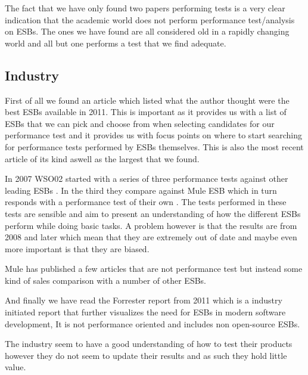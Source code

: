 \documentclass{llncs}
\begin{document}

The fact that we have only found two papers performing tests is a very clear indication that the academic world does not perform performance test/analysis on ESBs. The ones we have found are all considered old in a rapidly changing world and all but one performs a test that we find adequate.


\subsection{Industry}

First of all we found an article\cite{metha11} which listed what the author thought were the best ESBs available in 2011. This is important as it provides us with a list of ESBs that we can pick and choose from when selecting candidates for our performance test and it provides us with focus points on where to start searching for performance tests performed by ESBs themselves. This is also the most recent article of its kind aswell as the largest that we found.

In 2007 WSO02 started with a series of three performance tests against other leading ESBs \cite{Perera07,Perera07R2,Perera07R3}. In the third they compare against Mule ESB which in turn responds with a performance test of their own \cite{mulesoft08}. The tests performed in these tests are sensible and aim to present an understanding of how the different ESBs perform while doing basic tasks. A problem however is that the results are from 2008 and later which mean that they are extremely out of date and maybe even more important is that they are biased.


Mule has published a few articles that are not performance test but instead some kind of sales comparison with a number of other ESBs\cite{mulevsjboss,mulevsglassfish,mulevsservicemix}.

And finally we have read the Forrester report \cite{forrester11} from 2011 which is a industry initiated report that further visualizes the need for ESBs in modern software development, It is not performance oriented and includes non open-source ESBs.

The industry seem to have a good understanding of how to test their products however they do not seem to update their results and as such they hold little value.
\end{document}
